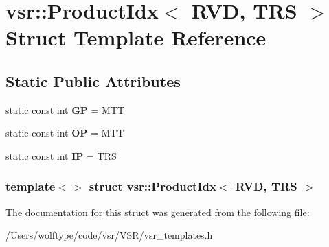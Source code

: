\hypertarget{structvsr_1_1_product_idx_3_01_r_v_d_00_01_t_r_s_01_4}{\section{vsr\-:\-:Product\-Idx$<$ R\-V\-D, T\-R\-S $>$ Struct Template Reference}
\label{structvsr_1_1_product_idx_3_01_r_v_d_00_01_t_r_s_01_4}
}
\subsection*{Static Public Attributes}
\begin{DoxyCompactItemize}
\item 
\hypertarget{structvsr_1_1_product_idx_3_01_r_v_d_00_01_t_r_s_01_4_a336a64d841f91f5c9f0f50eafd0d65e0}{static const int {\bfseries G\-P} = M\-T\-T}\label{structvsr_1_1_product_idx_3_01_r_v_d_00_01_t_r_s_01_4_a336a64d841f91f5c9f0f50eafd0d65e0}

\item 
\hypertarget{structvsr_1_1_product_idx_3_01_r_v_d_00_01_t_r_s_01_4_a0ffa56455653289bb80734e71eed2ae0}{static const int {\bfseries O\-P} = M\-T\-T}\label{structvsr_1_1_product_idx_3_01_r_v_d_00_01_t_r_s_01_4_a0ffa56455653289bb80734e71eed2ae0}

\item 
\hypertarget{structvsr_1_1_product_idx_3_01_r_v_d_00_01_t_r_s_01_4_a3f37d59e925a45968076b0d08534e520}{static const int {\bfseries I\-P} = T\-R\-S}\label{structvsr_1_1_product_idx_3_01_r_v_d_00_01_t_r_s_01_4_a3f37d59e925a45968076b0d08534e520}

\end{DoxyCompactItemize}
\subsubsection*{template$<$$>$ struct vsr\-::\-Product\-Idx$<$ R\-V\-D, T\-R\-S $>$}



The documentation for this struct was generated from the following file\-:\begin{DoxyCompactItemize}
\item 
/\-Users/wolftype/code/vsr/\-V\-S\-R/vsr\-\_\-templates.\-h\end{DoxyCompactItemize}
